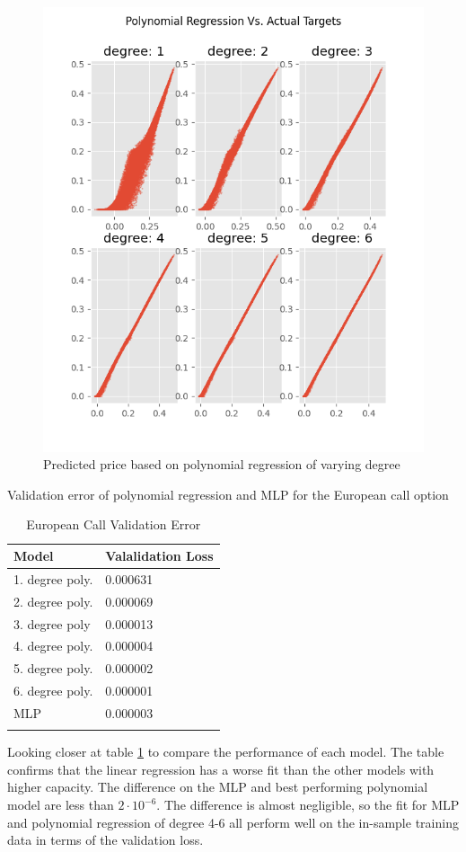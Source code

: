 \begin{figure}[H]
\centering
\includegraphics{Figures/polynomialEuroC.png}
\decoRule
\caption[Polynomial Regression Predictions Vs. Actual Prices]{Predicted price based on polynomial regression of varying degree}
\label{fig:PolynomialEuroC}
\end{figure}

\begin{table}[th]
\caption{European Call Validation Error}{Validation error of polynomial regression and MLP for the European call option}
\label{tab:euroPerformance}
\centering
\begin{tabular}{l l}
\toprule
\textbf{Model} & \textbf{Valalidation Loss} \\
\midrule
1. degree  poly. & 0.000631 \\
2. degree  poly.  & 0.000069 \\
3. degree poly & 0.000013\\
4. degree poly.  & 0.000004 \\
5. degree poly.  & 0.000002 \\
6. degree poly. & 0.000001\\
MLP        & 0.000003\\
\bottomrule\\
\end{tabular}
\end{table}
Looking closer at table \ref{tab:euroPerformance} to compare the performance of each model. The table confirms that the linear regression has a worse fit than the other models with higher capacity. The difference on the MLP and best performing polynomial model are less than $2\cdot 10^{-6}$. The difference is almost negligible, so the fit for MLP and polynomial regression of degree 4-6 all perform well on the in-sample training data in terms of the validation loss.


